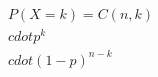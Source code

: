 \documentclass[preview]{standalone}
\begin{document}
\begin{align*}
P(X=k) =  C(n, k)  \\cdot  p^k  \\cdot  (1-p)^{n-k}
\end{align*}
\end{document}
